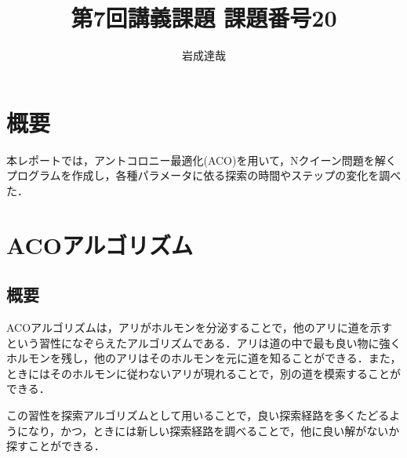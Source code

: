 \documentclass{jarticle}
\title{第7回講義課題 課題番号20}
\date{\todayd}
\author{岩成達哉}
\begin{document}
\begin{titlepage}
	\setlength{\topmargin}{1.1in}
	\vspace{100mm}
	\maketitle
\end{titlepage}

\begin{comment}
ACO（アントコロニー・アルゴリズム）を 応用し、Nクィーン問題を解くプログラムを作成せよ。 　　
各種パラメータ(ρ：フェロモンの蒸発率、もしあればα：TSPでの距離の重み指数に相当するパラメータなど）
問題サイズ
を様々に変化させ、実験結果を比較・考察すること。
以下の論文などが参考になる。

S. Khan et al.“Solution of n-Queen problem using ACO”. In proc. of 13th IEEE International Multi-topic Conference (INMIC 2009),2009.
\end{comment}


\section{概要}
本レポートでは，アントコロニー最適化(ACO)を用いて，Nクイーン問題を解くプログラムを作成し，各種パラメータに依る探索の時間やステップの変化を調べた．



\section{ACOアルゴリズム}

\subsection{概要}
ACOアルゴリズムは，アリがホルモンを分泌することで，他のアリに道を示すという習性になぞらえたアルゴリズムである．アリは道の中で最も良い物に強くホルモンを残し，他のアリはそのホルモンを元に道を知ることができる．また，ときにはそのホルモンに従わないアリが現れることで，別の道を模索することができる．

この習性を探索アルゴリズムとして用いることで，良い探索経路を多くたどるようになり，かつ，ときには新しい探索経路を調べることで，他に良い解がないか探すことができる．
\end{document}
